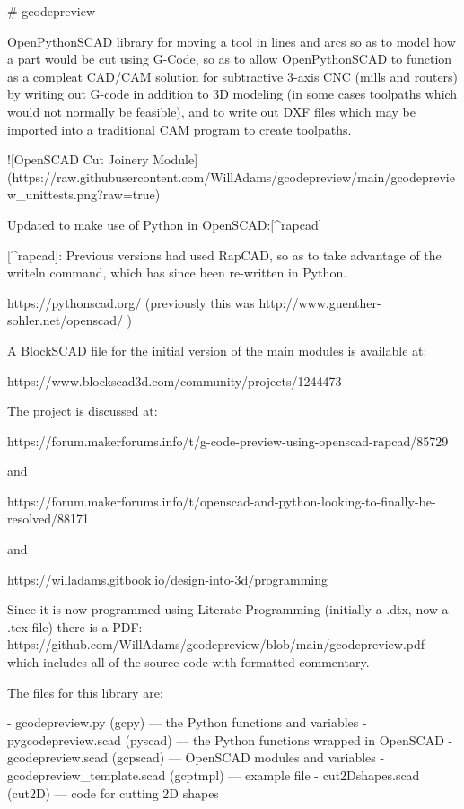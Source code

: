 \documentclass{ltxdoc}
\begin{document}
\begin{readme}
# gcodepreview

OpenPythonSCAD library for moving a tool in lines and arcs so as to model how a part would be cut using G-Code, so as to allow OpenPythonSCAD to function as a compleat CAD/CAM solution for subtractive 3-axis CNC (mills and routers) by writing out G-code in addition to 3D modeling (in some cases toolpaths which would not normally be feasible), and to write out DXF files which may be imported into a traditional CAM program to create toolpaths.

![OpenSCAD Cut Joinery Module](https://raw.githubusercontent.com/WillAdams/gcodepreview/main/gcodepreview_unittests.png?raw=true)

Updated to make use of Python in OpenSCAD:[^rapcad]

[^rapcad]: Previous versions had used RapCAD, so as to take advantage of the writeln command, which has since been re-written in Python.

https://pythonscad.org/ (previously this was http://www.guenther-sohler.net/openscad/ )

A BlockSCAD file for the initial version of the 
main modules is available at:

https://www.blockscad3d.com/community/projects/1244473

The project is discussed at:

https://forum.makerforums.info/t/g-code-preview-using-openscad-rapcad/85729 

and

https://forum.makerforums.info/t/openscad-and-python-looking-to-finally-be-resolved/88171

and

https://willadams.gitbook.io/design-into-3d/programming

Since it is now programmed using Literate Programming (initially a .dtx, now a .tex file) there is a PDF: https://github.com/WillAdams/gcodepreview/blob/main/gcodepreview.pdf which includes all of the source code with formatted commentary.

The files for this library are:

 - gcodepreview.py (gcpy) --- the Python functions and variables
 - pygcodepreview.scad (pyscad) --- the Python functions wrapped in OpenSCAD
 - gcodepreview.scad (gcpscad) --- OpenSCAD modules and variables
 - gcodepreview_template.scad (gcptmpl) --- example file
 - cut2Dshapes.scad (cut2D) --- code for cutting 2D shapes 


\end{readme}
\end{document}

